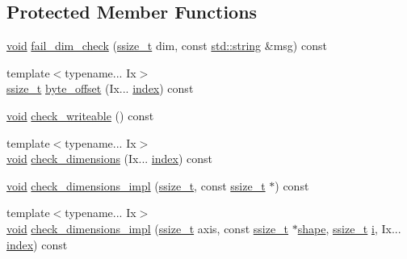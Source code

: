 \subsection*{Protected Member Functions}
\begin{DoxyCompactItemize}
\item 
\mbox{\hyperlink{_s_d_l__opengles2__gl2ext_8h_ae5d8fa23ad07c48bb609509eae494c95}{void}} \mbox{\hyperlink{classarray_a00dcb86f0bf1f925b23bd9ab028ffa13}{fail\+\_\+dim\+\_\+check}} (\mbox{\hyperlink{detail_2common_8h_ac430d16fc097b3bf0a7469cfd09decda}{ssize\+\_\+t}} dim, const \mbox{\hyperlink{_s_d_l__opengl__glext_8h_ab4ccfaa8ab0e1afaae94dc96ef52dde1}{std\+::string}} \&msg) const
\item 
{\footnotesize template$<$typename... Ix$>$ }\\\mbox{\hyperlink{detail_2common_8h_ac430d16fc097b3bf0a7469cfd09decda}{ssize\+\_\+t}} \mbox{\hyperlink{classarray_a336f1f7f56775fa328587645f2ab6e6f}{byte\+\_\+offset}} (Ix... \mbox{\hyperlink{_s_d_l__opengl__glext_8h_a57f14e05b1900f16a2da82ade47d0c6d}{index}}) const
\item 
\mbox{\hyperlink{_s_d_l__opengles2__gl2ext_8h_ae5d8fa23ad07c48bb609509eae494c95}{void}} \mbox{\hyperlink{classarray_a967db5bead19594b8f4a95c29b8aa13a}{check\+\_\+writeable}} () const
\item 
{\footnotesize template$<$typename... Ix$>$ }\\\mbox{\hyperlink{_s_d_l__opengles2__gl2ext_8h_ae5d8fa23ad07c48bb609509eae494c95}{void}} \mbox{\hyperlink{classarray_a1105041b04c18e91082ec096c0e53701}{check\+\_\+dimensions}} (Ix... \mbox{\hyperlink{_s_d_l__opengl__glext_8h_a57f14e05b1900f16a2da82ade47d0c6d}{index}}) const
\item 
\mbox{\hyperlink{_s_d_l__opengles2__gl2ext_8h_ae5d8fa23ad07c48bb609509eae494c95}{void}} \mbox{\hyperlink{classarray_a7eb067f2de82290601537066e4cdfc70}{check\+\_\+dimensions\+\_\+impl}} (\mbox{\hyperlink{detail_2common_8h_ac430d16fc097b3bf0a7469cfd09decda}{ssize\+\_\+t}}, const \mbox{\hyperlink{detail_2common_8h_ac430d16fc097b3bf0a7469cfd09decda}{ssize\+\_\+t}} $\ast$) const
\item 
{\footnotesize template$<$typename... Ix$>$ }\\\mbox{\hyperlink{_s_d_l__opengles2__gl2ext_8h_ae5d8fa23ad07c48bb609509eae494c95}{void}} \mbox{\hyperlink{classarray_a368cacc4c65057b1a97fb53ec158f98f}{check\+\_\+dimensions\+\_\+impl}} (\mbox{\hyperlink{detail_2common_8h_ac430d16fc097b3bf0a7469cfd09decda}{ssize\+\_\+t}} axis, const \mbox{\hyperlink{detail_2common_8h_ac430d16fc097b3bf0a7469cfd09decda}{ssize\+\_\+t}} $\ast$\mbox{\hyperlink{classarray_a084781a3d2cb3ea60ab7bcf16c30ee31}{shape}}, \mbox{\hyperlink{detail_2common_8h_ac430d16fc097b3bf0a7469cfd09decda}{ssize\+\_\+t}} \mbox{\hyperlink{abstract_8h_a13235ab5ddf5c2ccd5ca35ab01d91328}{i}}, Ix... \mbox{\hyperlink{_s_d_l__opengl__glext_8h_a57f14e05b1900f16a2da82ade47d0c6d}{index}}) const
\end{DoxyCompactItemize}
